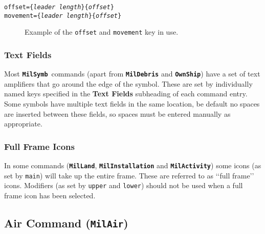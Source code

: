 \documentclass[a4paper, titlepage]{article}
\newcommand\MilSymb{\textbf{\texttt{MilSymb}}}
\begin{document}
\texttt{offset=\{\textit{leader length}\}\{\textit{offset}\}}\\
\indent\texttt{movement=\{\textit{leader length}\}\{\textit{offset}\}}

\begin{figure}[H]
\centering
{}
\caption{Example of the \texttt{offset} and \texttt{movement}  key in use.}
\end{figure}

\subsubsection{Text Fields}

Most \MilSymb\ commands (apart from \textbf{\texttt{MilDebris}} and \textbf{\texttt{OwnShip}}) have a set of text amplifiers that go around the edge of the symbol. These are set by individually named keys specified in the \textbf{Text Fields} subheading of each command entry. Some symbols have multiple text fields in the same location, be default no spaces are inserted between these fields, so spaces must be entered manually as appropriate.

\subsubsection{Full Frame Icons}

In some commands (\textbf{\texttt{MilLand}}, \textbf{\texttt{MilInstallation}} and \textbf{\texttt{MilActivity}}) some icons (as set by \texttt{main}) will take up the entire frame. These are referred to as \lq\lq{}full frame\rq\rq{} icons. Modifiers (as set by \texttt{upper} and \texttt{lower}) should not be used when a full frame icon has been selected.

\subsection{Air Command (\textbf{\texttt{MilAir}})}
\end{document}
